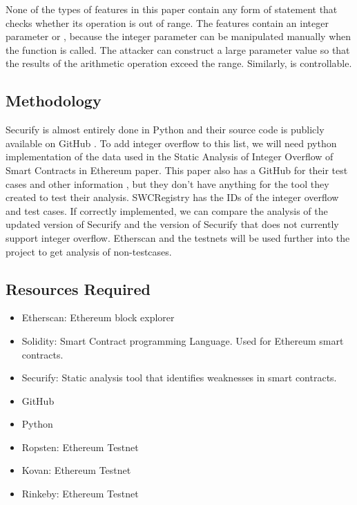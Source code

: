 \documentclass{article}
\begin{document}
None of the types of features in this paper contain any form of statement that checks whether its operation is out of range. The features contain an integer parameter or , because the integer parameter can be manipulated manually when the function is called. The attacker can construct a large parameter value so that the results of the arithmetic operation exceed the range. Similarly, is controllable. \cite{Static}

\subsection{Methodology}

Securify is almost entirely done in Python and their source code is publicly available on GitHub \cite{SecurifyGH}. To add integer overflow to this list, we will need python implementation of the data used in the Static Analysis of Integer Overflow of Smart Contracts in Ethereum paper. This paper also has a GitHub for their test cases and other information \cite{StaticTestCases}, but they don't have anything for the tool they created to test their analysis. SWCRegistry has the IDs of the integer overflow and test cases. If correctly implemented, we can compare the analysis of the updated version of Securify and the version of Securify that does not currently support integer overflow. Etherscan and the testnets will be used further into the project to get analysis of non-testcases. 

\subsection{Resources Required}

\begin{itemize}
\item Etherscan: Ethereum block explorer \cite{Etherscan}
\item Solidity: Smart Contract programming Language. Used for Ethereum smart contracts. \cite{Solidity1,Solidity2}
\item Securify: Static analysis tool that identifies weaknesses in smart contracts.
\item GitHub
\item Python
\item Ropsten: Ethereum Testnet \cite{Ropsten1,Ropsten2,Ropsten3,Ropsten4}
\item Kovan: Ethereum Testnet \cite{Kovan1,Kovan2,Kovan3}
\item Rinkeby: Ethereum Testnet \cite{Rinkeby1,Rinkeby2}
\end{itemize}
\end{document}
